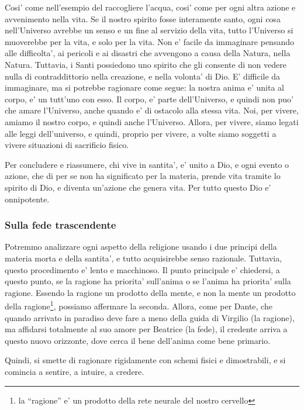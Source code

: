 Cosi' come nell'esempio del raccogliere l'acqua, cosi' come per ogni altra azione e avvenimento nella vita. Se il nostro spirito fosse interamente santo, ogni cosa nell'Universo avrebbe un senso e un fine al servizio della vita, tutto l'Universo si muoverebbe per la vita, e solo per la vita. Non e' facile da immaginare pensando alle difficolta', ai pericoli e ai disastri che avvengono a causa della Natura, nella Natura. Tuttavia, i Santi possiedono uno spirito che gli consente di non vedere nulla di contraddittorio nella creazione, e nella volonta' di Dio. E' difficile da immaginare, ma si potrebbe ragionare come segue: la nostra anima e' unita al corpo, e' un tutt'uno con esso. Il corpo, e' parte dell'Universo, e quindi non puo' che amare l'Universo, anche quando e' di ostacolo alla stessa vita. Noi, per vivere, amiamo il nostro corpo, e quindi anche l'Universo. Allora, per vivere, siamo legati alle leggi dell'universo, e quindi, proprio per vivere, a volte siamo soggetti a vivere situazioni di sacrificio fisico.

Per concludere e riassumere, chi vive in santita', e' unito a Dio, e ogni evento o azione, che di per se non ha significato per la materia, prende vita tramite lo spirito di Dio, e diventa un'azione che genera vita. Per tutto questo Dio e' onnipotente.


\subsubsection{Sulla fede trascendente}
\label{SullaFede}
Potremmo analizzare ogni aspetto della religione usando i due principi della materia morta e della santita', e tutto acquisirebbe senso razionale. Tuttavia, questo procedimento e' lento e macchinoso. Il punto principale e' chiedersi, a questo punto, se la ragione ha priorita' sull'anima o se l'anima ha priorita' sulla ragione. Essendo la ragione un prodotto della mente, e non la mente un prodotto della ragione\footnote{la ``ragione'' e' un prodotto della rete neurale del nostro cervello}, possiamo affermare la seconda. Allora, come per Dante, che quando arrivato in paradiso deve fare a meno della guida di Virgilio (la ragione), ma affidarsi totalmente al suo amore per Beatrice (la fede), il credente arriva a questo nuovo orizzonte, dove cerca il bene dell'anima come bene primario. 

Quindi, si smette di ragionare rigidamente con schemi fisici e dimostrabili, e si comincia a sentire, a intuire, a credere.

